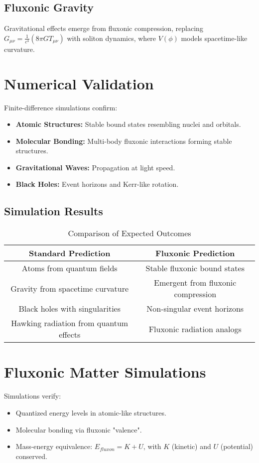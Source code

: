 \documentclass{article}
\begin{document}
\subsection{Fluxonic Gravity}
Gravitational effects emerge from fluxonic compression, replacing \(G_{\mu\nu} = \frac{1}{c^4} (8\pi G T_{\mu\nu})\) with soliton dynamics, where \(V(\phi)\) models spacetime-like curvature.

\section{Numerical Validation}
Finite-difference simulations confirm:
\begin{itemize}
    \item \textbf{Atomic Structures:} Stable bound states resembling nuclei and orbitals.
    \item \textbf{Molecular Bonding:} Multi-body fluxonic interactions forming stable structures.
    \item \textbf{Gravitational Waves:} Propagation at light speed.
    \item \textbf{Black Holes:} Event horizons and Kerr-like rotation.
\end{itemize}

\subsection{Simulation Results}
\begin{table}[h]
    \centering
    \begin{tabular}{|c|c|}
        \hline
        \textbf{Standard Prediction} & \textbf{Fluxonic Prediction} \\
        \hline
        Atoms from quantum fields & Stable fluxonic bound states \\
        Gravity from spacetime curvature & Emergent from fluxonic compression \\
        Black holes with singularities & Non-singular event horizons \\
        Hawking radiation from quantum effects & Fluxonic radiation analogs \\
        \hline
    \end{tabular}
    \caption{Comparison of Expected Outcomes}
    \label{tab:predictions}
\end{table}

\section{Fluxonic Matter Simulations}
Simulations verify:
\begin{itemize}
    \item Quantized energy levels in atomic-like structures.
    \item Molecular bonding via fluxonic "valence".
    \item Mass-energy equivalence: \(E_{fluxon} = K + U\), with \(K\) (kinetic) and \(U\) (potential) conserved.
\end{itemize}
\end{document}
